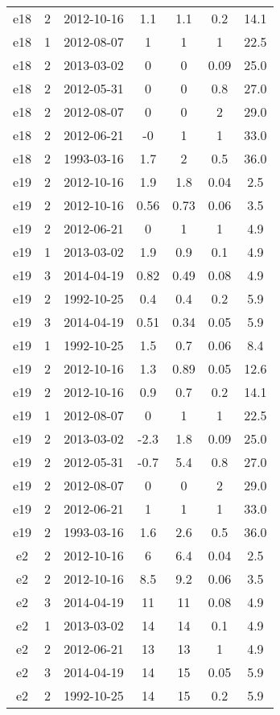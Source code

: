 \begin{table*}[htp]
\begin{tabular}{ccccccc}
e18 & 2 & 2012-10-16 & 1.1 & 1.1 & 0.2 & 14.1 \\
e18 & 1 & 2012-08-07 & 1 & 1 & 1 & 22.5 \\
e18 & 2 & 2013-03-02 & 0 & 0 & 0.09 & 25.0 \\
e18 & 2 & 2012-05-31 & 0 & 0 & 0.8 & 27.0 \\
e18 & 2 & 2012-08-07 & 0 & 0 & 2 & 29.0 \\
e18 & 2 & 2012-06-21 & -0 & 1 & 1 & 33.0 \\
e18 & 2 & 1993-03-16 & 1.7 & 2 & 0.5 & 36.0 \\
e19 & 2 & 2012-10-16 & 1.9 & 1.8 & 0.04 & 2.5 \\
e19 & 2 & 2012-10-16 & 0.56 & 0.73 & 0.06 & 3.5 \\
e19 & 2 & 2012-06-21 & 0 & 1 & 1 & 4.9 \\
e19 & 1 & 2013-03-02 & 1.9 & 0.9 & 0.1 & 4.9 \\
e19 & 3 & 2014-04-19 & 0.82 & 0.49 & 0.08 & 4.9 \\
e19 & 2 & 1992-10-25 & 0.4 & 0.4 & 0.2 & 5.9 \\
e19 & 3 & 2014-04-19 & 0.51 & 0.34 & 0.05 & 5.9 \\
e19 & 1 & 1992-10-25 & 1.5 & 0.7 & 0.06 & 8.4 \\
e19 & 2 & 2012-10-16 & 1.3 & 0.89 & 0.05 & 12.6 \\
e19 & 2 & 2012-10-16 & 0.9 & 0.7 & 0.2 & 14.1 \\
e19 & 1 & 2012-08-07 & 0 & 1 & 1 & 22.5 \\
e19 & 2 & 2013-03-02 & -2.3 & 1.8 & 0.09 & 25.0 \\
e19 & 2 & 2012-05-31 & -0.7 & 5.4 & 0.8 & 27.0 \\
e19 & 2 & 2012-08-07 & 0 & 0 & 2 & 29.0 \\
e19 & 2 & 2012-06-21 & 1 & 1 & 1 & 33.0 \\
e19 & 2 & 1993-03-16 & 1.6 & 2.6 & 0.5 & 36.0 \\
e2 & 2 & 2012-10-16 & 6 & 6.4 & 0.04 & 2.5 \\
e2 & 2 & 2012-10-16 & 8.5 & 9.2 & 0.06 & 3.5 \\
e2 & 3 & 2014-04-19 & 11 & 11 & 0.08 & 4.9 \\
e2 & 1 & 2013-03-02 & 14 & 14 & 0.1 & 4.9 \\
e2 & 2 & 2012-06-21 & 13 & 13 & 1 & 4.9 \\
e2 & 3 & 2014-04-19 & 14 & 15 & 0.05 & 5.9 \\
e2 & 2 & 1992-10-25 & 14 & 15 & 0.2 & 5.9 \\

\end{tabular}
\end{table*}
